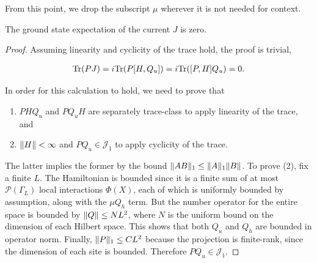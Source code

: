 \documentclass[12pt, letterpaper]{article}
\begin{document}
From this point, we drop the subscript $\mu$ wherever it is not needed for context.



\begin{lemma}
The ground state expectation of the current $J$ is zero.
\label{lemma:J=0}
\end{lemma}

\begin{proof}
Assuming linearity and cyclicity of the trace hold, the proof is trivial, 

\[\begin{aligned}
\text{Tr}(P J) = i\text{Tr}(P [H,Q_u]) = i\text{Tr}([P,H]Q_u) = 0.
\end{aligned}\]

In order for this calculation to hold, we need to prove that

\begin{enumerate}
\item $P H Q_u$ and $P Q_u H$ are separately trace-class to apply linearity of the trace, and 
\item $\lVert H \rVert<\infty$ and $P Q_u \in \mathcal{J}_1$ to apply cyclicity of the trace. 
\end{enumerate}

The latter implies the former by the bound $\lVert AB \rVert_1 \leq \lVert A \rVert_1\lVert B \rVert$.  To prove (2), fix a finite $L$. The Hamiltonian is bounded since it is a finite sum of at most $\mathcal{P}(\Gamma_L)$ local interactions $\Phi(X)$, each of which is uniformly bounded by assumption, along with the $\mu Q_h$ term. But the number operator for the entire space is bounded by $\lVert Q \rVert \leq NL^2$, where $N$ is the uniform bound on the dimension of each Hilbert space. This shows that both $Q_u$ and $Q_h$ are bounded in operator norm. Finally, $\lVert P \rVert_1\leq CL^2$ because the projection is finite-rank, since the dimension of each site is bounded. Therefore $P Q_u \in \mathcal{J}_1$.

\end{proof}
\end{document}
